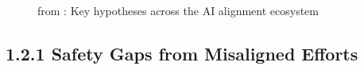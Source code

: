 \documentclass[
  11pt,
  letterpaper,
]{book}
\begin{document}
\begin{figure}


\caption[Key hypotheses in AI
alignment]{\label{fig-ai-hypotheses-map}from \textcite{cottier2019}: Key
hypotheses across the AI alignment ecosystem}

\end{figure}%

\subsection{1.2.1 Safety Gaps from Misaligned
Efforts}\label{safety-gaps-from-misaligned-efforts}
\end{document}
